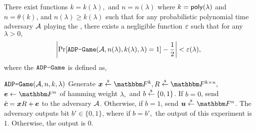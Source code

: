 \begin{assumption}\label{ass:avgDecProb}
There exist functions $k = k(\lambda),$ and $n = n(\lambda)$ where $k = \mathsf{poly}(\lambda)$ and $n = \theta(k)$, and $n(\lambda) \geq k(\lambda)$ such that for any probabilistic polynomial time adversary $\mathcal{A}$ playing the \ADPGame, there exists a negligible function $\varepsilon$ such that for any $\lambda > 0,$
\[\left|\Pr[\texttt{ADP-Game}(\mathcal{A},n(\lambda),k(\lambda),\lambda) = 1] - \frac{1}{2}\right| < \varepsilon(\lambda),\]
where the $\texttt{ADP-Game}$ is defined as,
\begin{weirdFrame}{$\texttt{ADP-Game}(\mathcal{A},n,k,\lambda)$}
Generate $\bx \unif \F^k, R \unif \F^{k \times n},$ $\be \leftarrow \F^n$ of hamming weight $\lambda,$ and $b \overset{{\scriptscriptstyle\$}}{\leftarrow} \{0,1\}$. 
If $b = 0$, send $\tilde{\boldsymbol{c}} = {\boldsymbol{x}} R + \boldsymbol{e}$ to the adversary $\mathcal{A}$.
Otherwise, if $b = 1$, send $\bu \unif \F^n$.
The adversary outputs bit $b' \in \{0,1\}$, where if $b = b',$ the output of this experiment is $1.$ Otherwise, the output is $0.$
\end{weirdFrame}
\end{assumption}